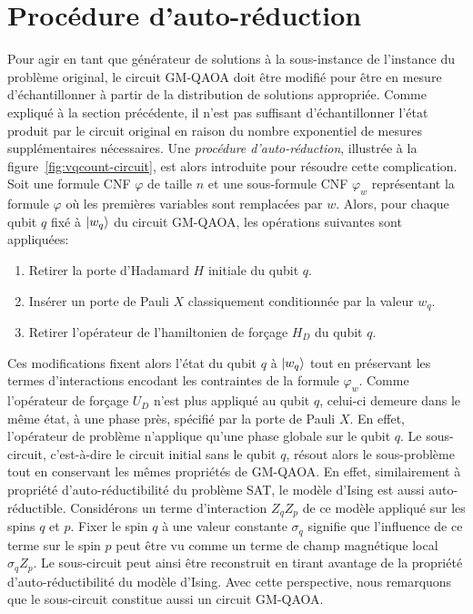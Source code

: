 
\section{Procédure d'auto-réduction}
\label{sec:procedure-auto-reduction}

Pour agir en tant que générateur de solutions à la sous-instance de l'instance du problème original, le circuit GM-QAOA doit être modifié pour être en mesure d'échantillonner à partir de la distribution de solutions appropriée. Comme expliqué à la section précédente, il n'est pas suffisant d'échantillonner l'état produit par le circuit original en raison du nombre exponentiel de mesures supplémentaires nécessaires. Une \textit{procédure d'auto-réduction}, illustrée à la figure~\ref{fig:vqcount-circuit}, est alors introduite pour résoudre cette complication. Soit une formule CNF $\varphi$ de taille $n$ et une sous-formule CNF $\varphi_{w}$ représentant la formule $\varphi$ où les premières variables sont remplacées par $w$. Alors, pour chaque qubit $q$ fixé à $\ket{w_{q}}$ du circuit GM-QAOA, les opérations suivantes sont appliquées:

\begin{enumerate}[(1)]
    \item Retirer la porte d'Hadamard $H$ initiale du qubit $q$.
    \item Insérer un porte de Pauli $X$ classiquement conditionnée par la valeur $w_{q}$.
    \item Retirer l'opérateur de l'hamiltonien de forçage $H_{D}$ du qubit $q$.
\end{enumerate}

Ces modifications fixent alors l'état du qubit $q$ à $\ket{w_{q}}$ tout en préservant les termes d'interactions encodant les contraintes de la formule $\varphi_{w}$. Comme l'opérateur de forçage $U_{D}$ n'est plus appliqué au qubit $q$, celui-ci demeure dans le même état, à une phase près, spécifié par la porte de Pauli $X$. En effet, l'opérateur de problème n'applique qu'une phase globale sur le qubit $q$. Le sous-circuit, c'est-à-dire le circuit initial sans le qubit $q$, résout alors le sous-problème tout en conservant les mêmes propriétés de GM-QAOA. En effet, similairement à propriété d'auto-réductibilité du problème SAT, le modèle d'Ising est aussi auto-réductible. Considérons un terme d'interaction $Z_{q}Z_{p}$ de ce modèle appliqué sur les spins $q$ et $p$. Fixer le spin $q$ à une valeur constante $\sigma_{q}$ signifie que l'influence de ce terme sur le spin $p$ peut être vu comme un terme de champ magnétique local $\sigma_{q} Z_{p}$. Le sous-circuit peut ainsi être reconstruit en tirant avantage de la propriété d'auto-réductibilité du modèle d'Ising. Avec cette perspective, nous remarquons que le sous-circuit constitue aussi un circuit GM-QAOA.     

